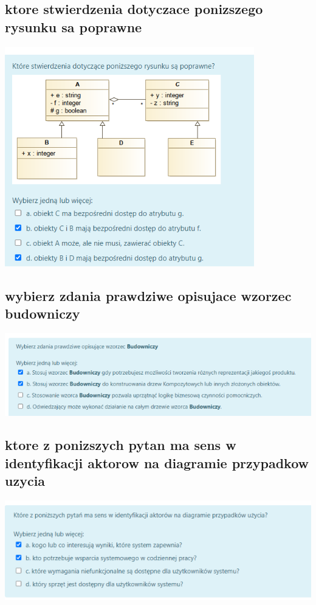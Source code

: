 \documentclass[11pt]{article}
\begin{document}
\subsection{ktore stwierdzenia dotyczace ponizszego rysunku sa poprawne}
\label{sec:org668518b}
\begin{center}
\includegraphics[width=.9\linewidth]{./zadanie11.png}
\end{center}

\subsection{wybierz zdania prawdziwe opisujace wzorzec budowniczy}
\label{sec:org217d2f7}
\begin{center}
\includegraphics[width=.9\linewidth]{./zadanie13.png}
\end{center}
\subsection{ktore z ponizszych pytan ma sens w identyfikacji aktorow na diagramie przypadkow uzycia}
\label{sec:orgaed0d69}
\begin{center}
\includegraphics[width=.9\linewidth]{./zadanie14.png}
\end{center}
\end{document}
